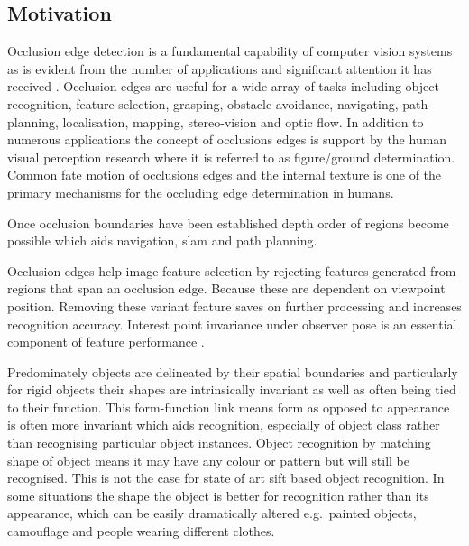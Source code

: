 \documentclass{article} %
\begin{document}
\subsection{Motivation}
Occlusion edge detection is a fundamental capability of computer vision systems as is evident from the number of applications and significant attention it has received
\cite{jacobson2012online,ayvaci2011detachable,sargin2009probabilistic,marshall1996occlusion,stein2009occlusion}.
Occlusion edges are useful for a wide array of tasks including object recognition, feature selection, grasping, obstacle avoidance, navigating, path-planning,  localisation, mapping, stereo-vision and optic flow.
In addition to numerous applications the concept of occlusions edges is support by the human visual perception research where it is referred to as figure/ground determination. Common fate motion \cite{wagemans2012century} of occlusions edges and the internal texture is one of the primary mechanisms for the occluding edge determination in humans.

Once occlusion boundaries have been established depth order of regions become possible \cite{sundberg2011occlusion,smith2004layered} which aids navigation, slam and path planning.


Occlusion edges help image feature selection by rejecting features generated from regions that span an occlusion edge.  Because these are dependent on viewpoint position.  Removing these variant feature saves on further processing and increases recognition accuracy.  Interest point invariance under observer pose is an essential component of feature performance \cite{gil2010comparative}.

Predominately objects are delineated by their spatial boundaries and particularly for rigid objects their shapes are intrinsically invariant as well as often being tied to their function.
This form-function link means form as opposed to appearance is often more invariant which aids recognition, especially of object class rather than  recognising particular object instances.
Object recognition by matching shape of object means it may have any colour or pattern but will still be recognised.  This is not the case for state of art sift based object recognition.
In some situations the shape the object is better for recognition rather than its appearance, which can be easily dramatically altered e.g.\ painted objects, camouflage and people wearing different clothes.
\end{document}
